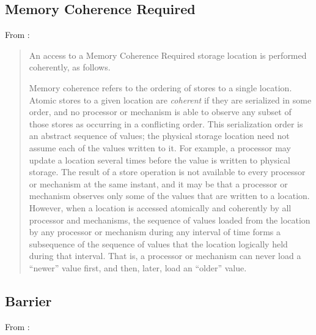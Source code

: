 \documentclass[10pt]{article}
\begin{document}
\subsection{Memory Coherence Required}\label{sec:memory-coherence}
From \cite[p.~5,Sec~1.6.3]{ppc-2}: 
\begin{quotation}
An access to a Memory Coherence Required storage location is performed coherently, as follows.

Memory coherence refers to the ordering of stores to a single
location. Atomic stores to a given location are {\em coherent} if they
are serialized in some order, and no processor or mechanism is able to
observe any subset of those stores as occurring in a conflicting
order. This serialization order is an abstract sequence of values; the
physical storage location need not assume each of the values written to
it. For example, a processor may update a location several times
before the value is written to physical storage. The result of a store
operation is not available to every processor or mechanism at the same
instant, and it may be that a processor or mechanism observes only
some of the values that are written to a location. However, when a
location is accessed atomically and coherently by all processor and
mechanisms, the sequence of values loaded from the location by any
processor or mechanism during any interval of time forms a subsequence
of the sequence of values that the location logically held during that
interval. That is, a processor or mechanism can never load a ``newer''
value first, and then, later, load an ``older'' value.
\end{quotation}
\subsection{Barrier}\label{sec:barrier}
From \cite[p.~15,Sec~1.7.1]{ppc-2}: 
\end{document}

